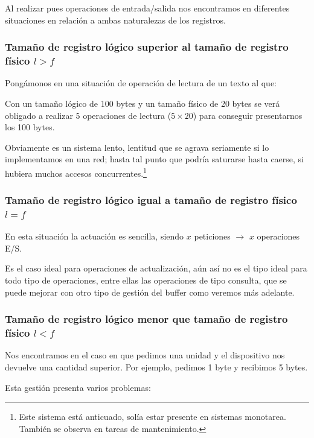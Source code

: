 \documentclass[a4paper, 11pt, titlepage]{article}
\begin{document}
        Al realizar pues operaciones de entrada/salida nos encontramos en diferentes situaciones en 
        relación a ambas naturalezas de los registros.

        \subsubsection{Tamaño de registro lógico superior al tamaño de registro físico $l>f$}

            Pongámonos en una situación de operación de lectura de un texto al que:

            Con un tamaño lógico de 100 bytes y un tamaño físico de 20 bytes se verá obligado a realizar
            5 operaciones de lectura ($5\times 20$) para conseguir presentarnos los 100 bytes.

            Obviamente es un sistema lento, lentitud que se agrava seriamente si lo implementamos en 
            una red; hasta tal punto que podría saturarse hasta caerse, si hubiera muchos accesos 
            concurrentes.\footnote{
                Este sistema está anticuado, solía estar presente en sistemas monotarea. También se 
                observa en tareas de mantenimiento.
            }

        \subsubsection{Tamaño de registro lógico igual a tamaño de registro físico $l = f$}

            En esta situación la actuación es sencilla, siendo $x$ peticiones $\rightarrow$ $x$
            operaciones E/S.

            Es el caso ideal para operaciones de actualización, aún así no es el tipo ideal para 
            todo tipo de operaciones, entre ellas las operaciones de tipo consulta, que se puede 
            mejorar con otro tipo de gestión del buffer como veremos más adelante.

        \subsubsection{Tamaño de registro lógico menor que tamaño de registro físico $l<f$}

            Nos encontramos en el caso en que pedimos una unidad y el dispositivo nos devuelve una cantidad 
            superior. Por ejemplo, pedimos 1 byte y recibimos 5 bytes.

            Esta gestión presenta varios problemas:
\end{document}
